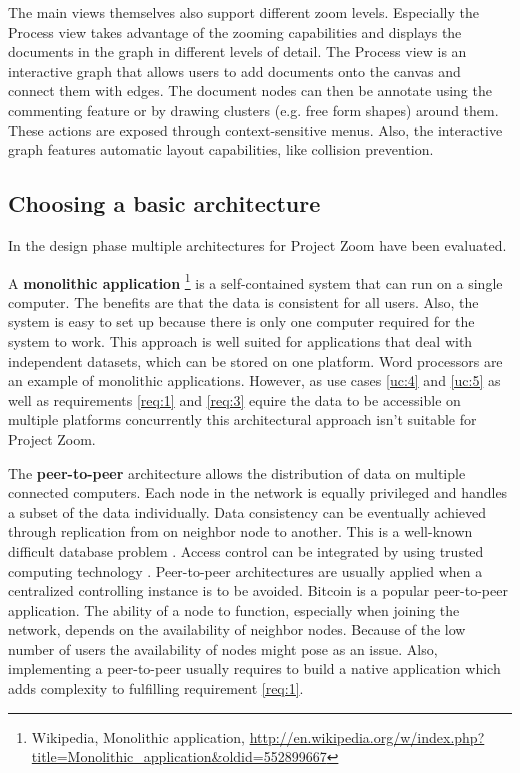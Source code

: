 The main views themselves also support different zoom levels. Especially the Process view takes advantage of the zooming capabilities and displays the documents in the graph in different levels of detail. 
The Process view is an interactive graph that allows users to add documents onto the canvas and connect them with edges. The document nodes can then be annotate using the commenting feature or by drawing clusters (e.g. free form shapes) around them. These actions are exposed through context-sensitive menus. Also, the interactive graph features automatic layout capabilities, like collision prevention.

\subsection{Choosing a basic architecture}
In the design phase multiple architectures for Project Zoom have been evaluated. 

A \textbf{monolithic application} \footnote{Wikipedia, Monolithic application, \url{http://en.wikipedia.org/w/index.php?title=Monolithic_application&oldid=552899667}} is a self-contained system that can run on a single computer. The benefits are that the data is consistent for all users.  Also, the system is easy to set up because there is only one computer required for the system to work. This approach is well suited for applications that deal with independent datasets, which can be stored on one platform. Word processors are an example of monolithic applications. However, as use cases \ref{uc:4} and \ref{uc:5} as well as requirements \ref{req:1} and \ref{req:3} equire the data to be accessible on multiple platforms concurrently this architectural approach isn't suitable for Project Zoom.

The \textbf{peer-to-peer} \cite{Schollmeier_2001} architecture allows the distribution of data on multiple connected computers. Each node in the network is equally privileged and handles a subset of the data individually. Data consistency can be eventually achieved through replication from on neighbor node to another. This is a well-known difficult database problem \cite{Gray_1996}. Access control can be integrated by using trusted computing technology \cite{Sandhu_2005}. Peer-to-peer architectures are usually applied when a centralized controlling instance is to be avoided. Bitcoin is a popular peer-to-peer application. The ability of a node to function, especially when joining the network, depends on the availability of neighbor nodes. Because of the low number of users the availability of nodes might pose as an issue. Also, implementing a peer-to-peer usually requires to build a native application which adds complexity to fulfilling requirement \ref{req:1}.

